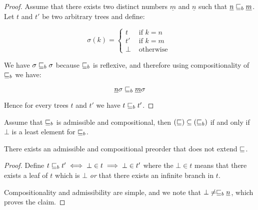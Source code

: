 \begin{ensps}

\begin{proof}
    Assume that there exists two distinct numbers $\underline{m}$
    and $\underline{n}$ such that $\underline{n} \sqsubseteq_b \underline{m}$.
    Let $t$ and $t'$ be 
    two arbitrary trees and define:

    \begin{equation*}
        \sigma(k) = \begin{cases}
            t  & \text{ if } k = n \\
            t' & \text{ if } k = m \\
            \bot  & \text{ otherwise } 
        \end{cases}
    \end{equation*}

    We have $\sigma \sqsubseteq_b \sigma$ because $\sqsubseteq_b$
    is reflexive, and therefore using compositionality 
    of $\sqsubseteq_b$ we have:

    \begin{equation*}
        \underline{n}\sigma \sqsubseteq_b \underline{m}\sigma
    \end{equation*}

    Hence for every trees $t$ and $t'$ we have 
    $t \sqsubseteq_b t'$.
\end{proof}
\end{ensps}

\begin{alemma}
    \label{lem:coarserpreorder}
    Assume that $\sqsubseteq_b$ is admissible and compositional,
    then $(\sqsubseteq) \subseteq (\sqsubseteq_b)$ if and only if
    $\bot$ is a least element for $\sqsubseteq_b$.
\end{alemma}

\begin{ensps}
    
\begin{example}
    There exists an admissible and compositional 
    preorder that does not extend $\sqsubseteq$.
\end{example}

\begin{proof}
    Define $t \sqsubseteq_b t' \iff \bot \in t \implies \bot \in t'$ where
    the $\bot \in t$ means that there exists a leaf of $t$ 
    which is $\bot$ \emph{or} that there exists an infinite branch 
    in $t$.

    Compositionality and admissibility are simple, and we note 
    that $\bot \neq \sqsubseteq_b \underline{n}$, which proves 
    the claim.
\end{proof}
\end{ensps}


